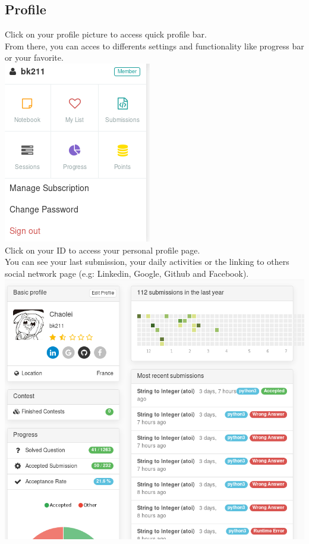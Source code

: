 \documentclass[12pt, letterpaper]{article}
\begin{document}
\subsection{Profile}
Click on your profile picture to access quick profile bar.\\
From there, you can acces to differents settings and functionality like progress bar or your favorite.\\
\includegraphics{img/L4.png}\\
Click on your ID to access your personal profile page.\\
You can see your last submission, your daily activities or the linking to others social network page (e.g: Linkedin, Google, Github and Facebook).
\includegraphics[width=\linewidth]{img/L6.png}
\end{document}
